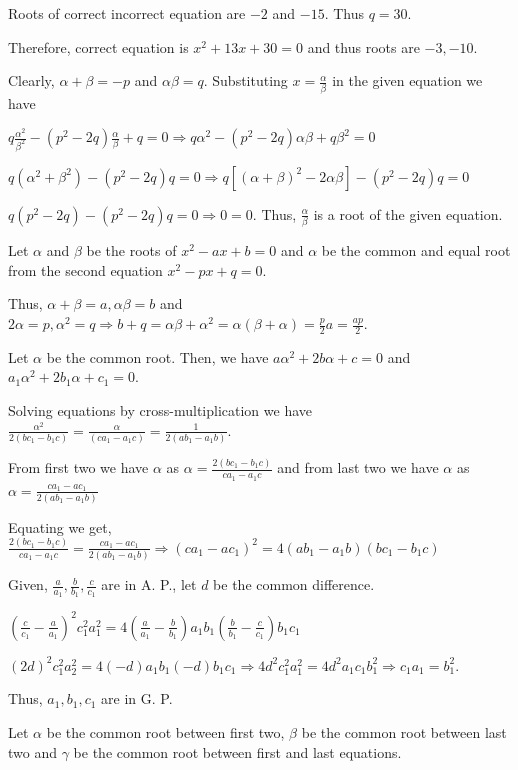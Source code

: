  Roots of correct incorrect equation are $-2$ and $-15.$ Thus $q = 30$.

  Therefore, correct equation is $x^2 + 13x + 30 = 0$ and thus roots are $-3, -10$.
\item Clearly, $\alpha + \beta = -p$ and $\alpha\beta = q$. Substituting $x = \frac{\alpha}{\beta}$ in the
  given equation we have

  $q\frac{\alpha^2}{\beta^2} - (p^2 - 2q)\frac{\alpha}{\beta} + q = 0 \Rightarrow q\alpha^2 - (p^2 -
  2q)\alpha\beta + q\beta^2 = 0$

  $q(\alpha^2 + \beta^2) - (p^2 - 2q)q = 0 \Rightarrow q[(\alpha + \beta)^2 - 2\alpha\beta] - (p^2 - 2q)q = 0$

  $q(p^2 - 2q) - (p^2 - 2q)q = 0 \Rightarrow 0 = 0$. Thus, $\frac{\alpha}{\beta}$ is a root of the given
  equation.
\item Let $\alpha$ and $\beta$ be the roots of $x^2 - ax + b = 0$ and $\alpha$ be the common and equal root
  from the second equation $x^2 - px + q = 0$.

  Thus, $\alpha + \beta = a, \alpha\beta = b$ and $2\alpha = p, \alpha^2 = q\Rightarrow b + q =
  \alpha\beta + \alpha^2 = \alpha(\beta + \alpha) = \frac{p}{2}a = \frac{ap}{2}$.
\item Let $\alpha$ be the common root. Then, we have $a\alpha^2 + 2b\alpha + c = 0$ and $a_1\alpha^2 + 2b_1\alpha + c_1 = 0$.

  Solving equations by cross-multiplication we have $\frac{\alpha^2}{2(bc_1 - b_1c)} = \frac{\alpha}{(ca_1 -
    a_1c)} = \frac{1}{2(ab_1 - a_1b)}$.

  From first two we have $\alpha$ as $\alpha = \frac{2(bc_1 - b_1c)}{ca_1 - a_1c}$ and from last two we have
  $\alpha$ as $\alpha = \frac{ca_1 - ac_1}{2(ab_1 - a_1b)}$

  Equating we get, $\frac{2(bc_1 - b_1c)}{ca_1 - a_1c} = \frac{ca_1 - ac_1}{2(ab_1 - a_1b)}\Rightarrow (ca_1
  - ac_1)^2 = 4(ab_1 - a_1b)(bc_1 - b_1c)$

  Given, $\frac{a}{a_1}, \frac{b}{b_1}, \frac{c}{c_1}$ are in A. P., let $d$ be the common difference.

  $\left(\frac{c}{c_1} - \frac{a}{a_1}\right)^2c_1^2a_1^2 = 4\left(\frac{a}{a_1} -
  \frac{b}{b_1}\right)a_1b_1\left(\frac{b}{b_1} - \frac{c}{c_1}\right)b_1c_1$

  $(2d)^2c_1^2a_2^2 = 4(-d)a_1b_1(-d)b_1c_1\Rightarrow 4d^2c_1^2a_1^2 = 4d^2a_1c_1b_1^2 \Rightarrow c_1a_1 =
  b_1^2$.

  Thus, $a_1, b_1, c_1$ are in G. P.
\item Let $\alpha$ be the common root between first two, $\beta$ be the common root between last two and $\gamma$ be
  the common root between first and last equations.

